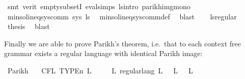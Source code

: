 \begin{isabellebody}
\ {\isacharparenleft}{\kern0pt}smt\ {\isacharparenleft}{\kern0pt}verit{\isacharparenright}{\kern0pt}\ empty{\isacharunderscore}{\kern0pt}subsetI\ eval{\isachardot}{\kern0pt}simps{\isacharparenleft}{\kern0pt}{}{\isacharparenright}{\kern0pt}\ ls{\isacharprime}{\kern0pt}{\isacharunderscore}{\kern0pt}intro\ parikh{\isacharunderscore}{\kern0pt}img{\isacharunderscore}{\kern0pt}mono{\isacharparenright}{\kern0pt}\isanewline
\ \ \isamarkupfalse%
\isanewline
\ \ \isamarkupfalse%
\ \isamarkupfalse%
\ {\isachardoublequoteopen}min{\isacharunderscore}{\kern0pt}sol{\isacharunderscore}{\kern0pt}ineq{\isacharunderscore}{\kern0pt}sys{\isacharunderscore}{\kern0pt}comm\ sys\ {\isacharquery}{\kern0pt}ls{\isacharprime}{\kern0pt}{\isachardoublequoteclose}\ \isamarkupfalse%
\ min{\isacharunderscore}{\kern0pt}sol{\isacharunderscore}{\kern0pt}ineq{\isacharunderscore}{\kern0pt}sys{\isacharunderscore}{\kern0pt}comm{\isacharunderscore}{\kern0pt}def\ \isamarkupfalse%
\ blast\isanewline
\ \ \isamarkupfalse%
\ ls{\isacharprime}{\kern0pt}{\isacharunderscore}{\kern0pt}regular\ \isamarkupfalse%
\ {\isacharquery}{\kern0pt}thesis\ \isamarkupfalse%
\ blast\isanewline
{}\isamarkupfalse%
%
\endisatagproof
{\isafoldproof}%
%
\isadelimproof
%
\endisadelimproof
%
\isadelimdocument
%
\endisadelimdocument
%
\isatagdocument
%
\isamarkuptrue%
%
\endisatagdocument
{\isafolddocument}%
%
\isadelimdocument
%
\endisadelimdocument
%
\begin{isamarkuptext}%
Finally we are able to prove Parikh's theorem, i.e.\ that to each context free grammar exists
a regular language with identical Parikh image:%
\end{isamarkuptext}\isamarkuptrue%
\isamarkupfalse%
\ Parikh{\isacharcolon}{\kern0pt}\isanewline
\ \ \ {\isachardoublequoteopen}CFL\ {\isacharparenleft}{\kern0pt}TYPE{\isacharparenleft}{\kern0pt}{\isacharprime}{\kern0pt}n{\isacharparenright}{\kern0pt}{\isacharparenright}{\kern0pt}\ L{\isachardoublequoteclose}\isanewline
\ \ \ \ \ {\isachardoublequoteopen}{\isasymexists}L{\isacharprime}{\kern0pt}{\isachardot}{\kern0pt}\ regular{\isacharunderscore}{\kern0pt}lang\ L{\isacharprime}{\kern0pt}\ {\isasymand}\ {\isasymPsi}\ L\ {\isacharequal}{\kern0pt}\ {\isasymPsi}\ L{\isacharprime}{\kern0pt}{\isachardoublequoteclose}\isanewline
%
\isadelimproof

\end{isabellebody}
